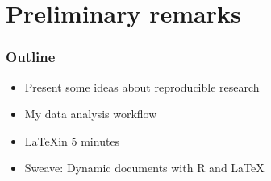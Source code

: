 \documentclass[bigger]{beamer}
\begin{document}
\section{Preliminary remarks}
\label{sec-1}
\begin{frame}
\frametitle{Outline}
\label{sec-1_1}
\begin{itemize}

\item Present some ideas about reproducible research\\
\label{sec-1_1_1}%
\item My data analysis workflow\\
\label{sec-1_1_2}%
\item \LaTeX in 5 minutes\\
\label{sec-1_1_3}%
\item Sweave: Dynamic documents with R and \LaTeX\\
\label{sec-1_1_4}%
\end{itemize} %
\end{frame}
\end{document}
